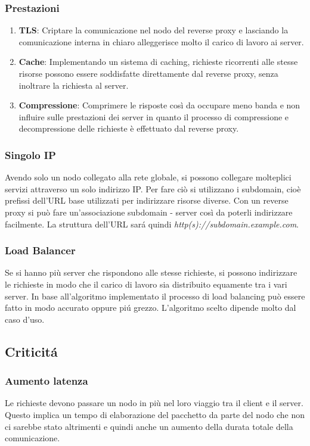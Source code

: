 \subsubsection{Prestazioni}
\begin{enumerate}
  \item \textbf{TLS}: Criptare la comunicazione nel nodo del reverse proxy e lasciando la comunicazione interna in chiaro alleggerisce molto il carico di lavoro ai server.
  \item \textbf{Cache}: Implementando un sistema di caching, richieste ricorrenti alle stesse risorse possono essere soddisfatte direttamente dal reverse proxy, senza inoltrare la richiesta al server.
  \item \textbf{Compressione}: Comprimere le risposte così da occupare meno banda e non influire sulle prestazioni dei server in quanto il processo di compressione e decompressione delle richieste è effettuato dal reverse proxy.
\end{enumerate}

\subsubsection{Singolo IP}
Avendo solo un nodo collegato alla rete globale, si possono collegare molteplici servizi attraverso un solo indirizzo IP. Per fare ciò si utilizzano i subdomain, cioè prefissi dell'URL base utilizzati per indirizzare risorse diverse. Con un reverse proxy si può fare un'associazione subdomain - server così da poterli indirizzare facilmente. La struttura dell'URL sará quindi \textit{http(s)://subdomain.example.com}.

\subsubsection{Load Balancer}
Se si hanno più server che rispondono alle stesse richieste, si possono indirizzare le richieste in modo che il carico di lavoro sia distribuito equamente tra i vari server. In base all'algoritmo implementato il processo di load balancing può essere fatto in modo accurato oppure piú grezzo. L'algoritmo scelto dipende molto dal caso d'uso.

\subsection{Criticitá}
\cite{risks}
\subsubsection{Aumento latenza}
Le richieste devono passare un nodo in più nel loro viaggio tra il client e il server. Questo implica un tempo di elaborazione del pacchetto da parte del nodo che non ci sarebbe stato altrimenti e quindi anche un aumento della durata totale della comunicazione.
